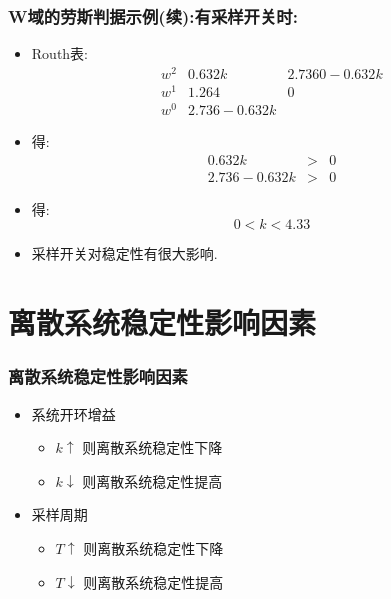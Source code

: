 \documentclass[table]{beamer}
\begin{document}
\begin{frame}
\frametitle{W域的劳斯判据示例(续):有采样开关时:}
\label{sec-2-4}

\begin{itemize}
\item Routh表:
     \[\begin{matrix}
     w^2 & 0.632k & 2.7360-0.632k \\
     w^1 & 1.264  & 0 \\
     w^0 & 2.736-0.632k
     \end{matrix}\]
\item 得:
     \begin{eqnarray*}
     0.632k &>  & 0\\
     2.736-0.632k& >& 0
     \end{eqnarray*}
\item 得:  
     \[0<k<4.33\]
\item <2->采样开关对稳定性有很大影响.
\end{itemize}
\end{frame}
\section{离散系统稳定性影响因素}
\label{sec-3}
\begin{frame}
\frametitle{离散系统稳定性影响因素}
\label{sec-3-1}

\begin{itemize}
\item <2->系统开环增益
\begin{itemize}
\item $k\uparrow$  则离散系统稳定性下降
\item $k\downarrow$  则离散系统稳定性提高
\end{itemize}
\item <3->采样周期
\begin{itemize}
\item $T\uparrow$  则离散系统稳定性下降
\item $T\downarrow$  则离散系统稳定性提高
\end{itemize}
\end{itemize}
\end{frame}
\end{document}
